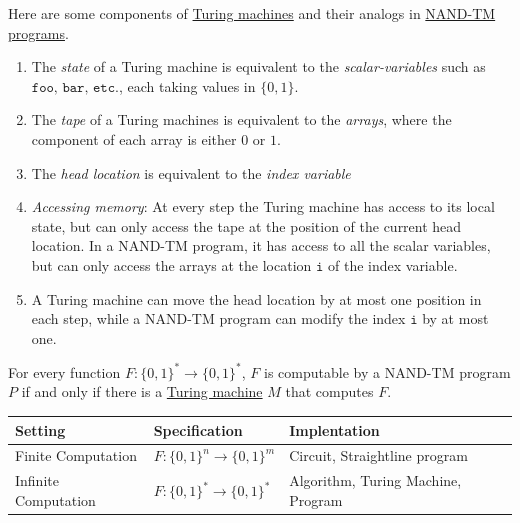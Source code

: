   Here are some components of \hyperref[def:turing-machine]{Turing machines} and their analogs in \hyperref[def:nand-tm-programs]{NAND-TM programs}. 
  \begin{enumerate}
      \item The \textit{state} of a Turing machine is equivalent to the \textit{scalar-variables} such as $\texttt{foo, bar, etc.}$, each taking values in $\{0,1\}$. 
      \item The \textit{tape} of a Turing machines is equivalent to the \textit{arrays}, where the component of each array is either $0$ or $1$. 
      \item The \textit{head location} is equivalent to the \textit{index variable}
      \item \textit{Accessing memory}: At every step the Turing machine has access to its local state, but can only access the tape at the position of the current head location. In a NAND-TM program, it has access to all the scalar variables, but can only access the arrays at the location $\texttt{i}$ of the index variable. 
      \item A Turing machine can move the head location by at most one position in each step, while a NAND-TM program can modify the index $\texttt{i}$ by at most one. 
  \end{enumerate}

  \begin{theorem}
    \label{thm:equivalence-of-turing-machines-and-nand-tm}
  For every function $F: \{0,1\}^* \to \{0,1\}^*$, $F$ is computable by a NAND-TM program $P$ if and only if there is a \hyperref[def:turing-machine]{Turing machine} $M$ that computes $F$. 
  \end{theorem}

  \begin{center}
  \begin{tabular}{l|l|l}
      Setting & Specification & Implentation \\
      \hline
      Finite Computation& $F: \{0,1\}^n \rightarrow \{0,1\}^m$ & Circuit, Straightline program \\
      Infinite Computation & $F: \{0,1\}^* \rightarrow \{0,1\}^*$ & Algorithm, Turing Machine, Program
  \end{tabular}
  \end{center}

